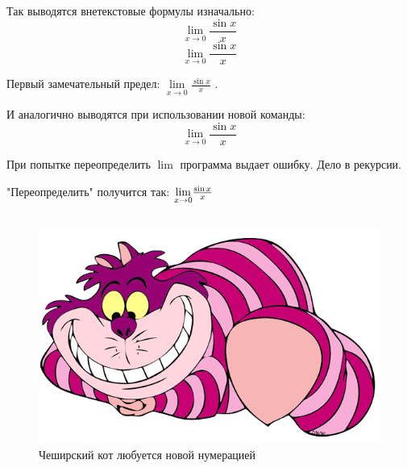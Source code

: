\documentclass[12pt, a4paper]{article}
\theoremstyle{plain}              %
\theoremstyle{definition}         %
\begin{document}
\subsection{}
Так выводятся внетекстовые формулы изначально:
\[ \lim\limits_{x \to 0} \frac{\sin{x}}{x} \]
\[ \lim_{x \to 0} \frac{\sin{x}}{x} \]

\newcommand{\llim}{\displaystyle \lim\limits_{x \to 0} \frac{\sin{x}}{x}}
Первый замечательный предел: $\llim$ .

И аналогично выводятся при использовании новой команды:
\[ \llim \]

При попытке переопределить $\lim$ программа выдает ошибку. Дело в рекурсии.

"Переопределить"{} получится так:
{\renewcommand{\lim}{\underset{x \to 0}{\qopname \relax m{lim}}{\frac{\sin{x}}{x}}}
$\lim$}

\subsection{}
\renewcommand{\thefigure}{\thesubsection.\arabic{figure}}
\setcounter{figure}{0} 

\begin{figure}[H]
\begin{center}
\includegraphics[scale=0.5]{cheshirecat.png} 
\end{center}
\caption{Чеширский кот любуется новой нумерацией}
\end{figure}
\end{document}
